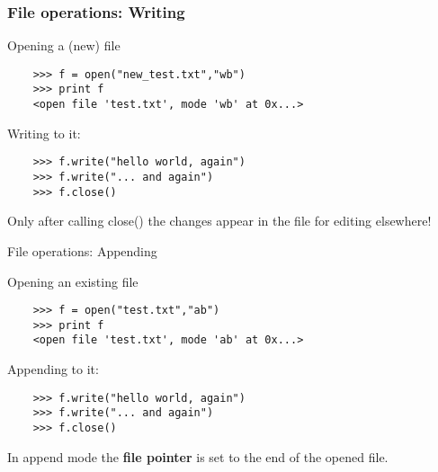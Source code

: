 \begin{frame}[fragile]

  \frametitle{File operations: Writing}

  Opening a (new) file 

  \begin{verbatim}
    >>> f = open("new_test.txt","wb")
    >>> print f
    <open file 'test.txt', mode 'wb' at 0x...>
  \end{verbatim}
  \bigskip
  \pause
  Writing to it:
  \begin{verbatim}
    >>> f.write("hello world, again")
    >>> f.write("... and again")
    >>> f.close()
  \end{verbatim}
  \pause
  \vspace{0.65cm}

  \begin{arrowlist}
  \item Only after calling close() the changes appear in the file for
    editing elsewhere!
  \end{arrowlist}

\end{frame}

\begin{frame}[fragile]{File operations: Appending}

  Opening an existing file 

  \begin{verbatim}
    >>> f = open("test.txt","ab")
    >>> print f
    <open file 'test.txt', mode 'ab' at 0x...>
  \end{verbatim}
  \bigskip
  \pause  

  Appending to it:
  \begin{verbatim}
    >>> f.write("hello world, again")
    >>> f.write("... and again")
    >>> f.close()
  \end{verbatim}
  \pause
  \vspace{0.8cm}

  \begin{arrowlist}
  \item In append mode the \textbf{file pointer} is set to the end of the opened file.
  \end{arrowlist}

\end{frame}


